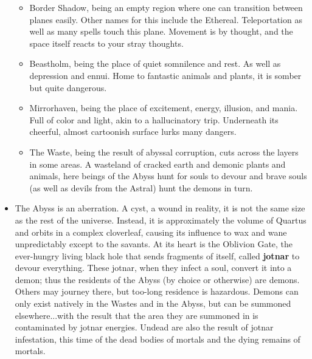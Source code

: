\begin{itemize}
	\begin{itemize}
		\item Border Shadow, being an empty region where one can transition between planes easily. Other names for this include the Ethereal. Teleportation as well as many spells touch this plane. Movement is by thought, and the space itself reacts to your stray thoughts.
		\item Beastholm, being the place of quiet somnilence and rest. As well as depression and ennui. Home to fantastic animals and plants, it is somber but quite dangerous.
		\item Mirrorhaven, being the place of excitement, energy, illusion, and mania. Full of color and light, akin to a hallucinatory trip. Underneath its cheerful, almost cartoonish surface lurks many dangers.
		\item The Waste, being the result of abyssal corruption, cuts across the layers in some areas. A wasteland of cracked earth and demonic plants and animals, here beings of the Abyss hunt for souls to devour and brave souls (as well as devils from the Astral) hunt the demons in turn.
	\end{itemize}
	\item The Abyss is an aberration. A cyst, a wound in reality, it is not the same size as the rest of the universe. Instead, it is approximately the volume of Quartus and orbits in a complex cloverleaf, causing its influence to wax and wane unpredictably except to the savants. At its heart is the Oblivion Gate, the ever-hungry living black hole that sends fragments of itself, called \textbf{jotnar} to devour everything. These jotnar, when they infect a soul, convert it into a demon; thus the residents of the Abyss (by choice or otherwise) are demons. Others may journey there, but too-long residence is hazardous. Demons can only exist natively in the Wastes and in the Abyss, but can be summoned elsewhere...with the result that the area they are summoned in is contaminated by jotnar energies. Undead are also the result of jotnar infestation, this time of the dead bodies of mortals and the dying remains of mortals.
\end{itemize}

